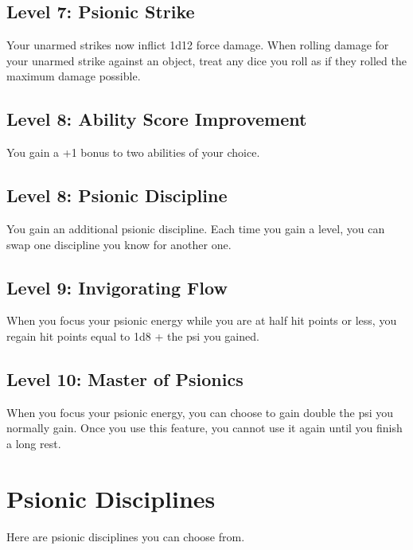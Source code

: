 \documentclass[12pt,letterpaper,twocolumn,openany,nodeprecatedcode,bg=none]{dndbook}
\begin{document}
\subsection{Level 7: Psionic Strike}\label{level-7-psionic-strike}

Your unarmed strikes now inflict 1d12 force damage. When rolling damage
for your unarmed strike against an object, treat any dice you roll as if
they rolled the maximum damage possible.

\subsection{Level 8: Ability Score
Improvement}\label{level-8-ability-score-improvement}

You gain a +1 bonus to two abilities of your choice.

\subsection{Level 8: Psionic
Discipline}\label{level-8-psionic-discipline}

You gain an additional psionic discipline. Each time you gain a level,
you can swap one discipline you know for another one.

\subsection{Level 9: Invigorating Flow}\label{level-9-invigorating-flow}

When you focus your psionic energy while you are at half hit points or
less, you regain hit points equal to 1d8 + the psi you gained.

\subsection{Level 10: Master of
Psionics}\label{level-10-master-of-psionics}

When you focus your psionic energy, you can choose to gain double the
psi you normally gain. Once you use this feature, you cannot use it
again until you finish a long rest.

\section{Psionic Disciplines}\label{psionic-disciplines}

Here are psionic disciplines you can choose from.
\end{document}
